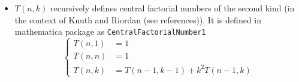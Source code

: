 \begin{itemize}
    \item $T(n,k)$ recursively defines central factorial numbers of the second kind
    (in the context of Knuth and Riordan (see references)).
    It is defined in mathematica package as \texttt{CentralFactorialNumber1}
    \begin{equation*}
        \begin{cases}
            T(n,1) &= 1 \\
            T(n,n) &= 1 \\
            T(n,k) &= T(n-1, k-1) + k^2 T(n-1, k)
        \end{cases}
    \end{equation*}
\end{itemize}